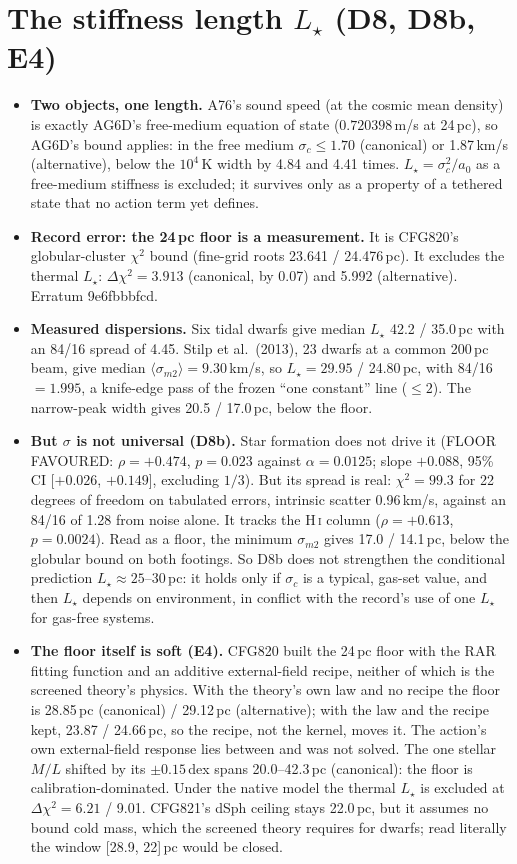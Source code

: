 \documentclass[10pt]{article}
\begin{document}
\section{The stiffness length $L_\star$ (D8, D8b, E4)}
\begin{itemize}
\item \textbf{Two objects, one length.} A76's sound speed (at the cosmic mean density) is exactly AG6D's free-medium equation of state ($0.720398$\,m/s at 24\,pc), so AG6D's bound applies: in the free medium $\sigma_c\le1.70$ (canonical) or 1.87\,km/s (alternative), below the $10^4$\,K width by 4.84 and 4.41 times. $L_\star=\sigma_c^2/a_0$ as a free-medium stiffness is excluded; it survives only as a property of a tethered state that no action term yet defines.
\item \textbf{Record error: the 24\,pc floor is a measurement.} It is CFG820's globular-cluster $\chi^2$ bound (fine-grid roots 23.641 / 24.476\,pc). It excludes the thermal $L_\star$: $\Delta\chi^2=3.913$ (canonical, by 0.07) and 5.992 (alternative). Erratum 9e6fbbbfcd.
\item \textbf{Measured dispersions.} Six tidal dwarfs give median $L_\star$ 42.2 / 35.0\,pc with an 84/16 spread of 4.45. Stilp et al.\ (2013), 23 dwarfs at a common 200\,pc beam, give median $\langle\sigma_{m2}\rangle=9.30$\,km/s, so $L_\star=29.95$ / 24.80\,pc, with 84/16 $=1.995$, a knife-edge pass of the frozen ``one constant'' line ($\le2$). The narrow-peak width gives 20.5 / 17.0\,pc, below the floor.
\item \textbf{But $\sigma$ is not universal (D8b).} Star formation does not drive it (FLOOR FAVOURED: $\rho=+0.474$, $p=0.023$ against $\alpha=0.0125$; slope $+0.088$, 95\% CI [$+0.026$, $+0.149$], excluding $1/3$). But its spread is real: $\chi^2=99.3$ for 22 degrees of freedom on tabulated errors, intrinsic scatter 0.96\,km/s, against an 84/16 of 1.28 from noise alone. It tracks the H\,\textsc{i} column ($\rho=+0.613$, $p=0.0024$). Read as a floor, the minimum $\sigma_{m2}$ gives 17.0 / 14.1\,pc, below the globular bound on both footings. So D8b does not strengthen the conditional prediction $L_\star\approx25$--30\,pc: it holds only if $\sigma_c$ is a typical, gas-set value, and then $L_\star$ depends on environment, in conflict with the record's use of one $L_\star$ for gas-free systems.
\item \textbf{The floor itself is soft (E4).} CFG820 built the 24\,pc floor with the RAR fitting function and an additive external-field recipe, neither of which is the screened theory's physics. With the theory's own law and no recipe the floor is 28.85\,pc (canonical) / 29.12\,pc (alternative); with the law and the recipe kept, 23.87 / 24.66\,pc, so the recipe, not the kernel, moves it. The action's own external-field response lies between and was not solved. The one stellar $M/L$ shifted by its $\pm0.15$\,dex spans 20.0--42.3\,pc (canonical): the floor is calibration-dominated. Under the native model the thermal $L_\star$ is excluded at $\Delta\chi^2=6.21$ / 9.01. CFG821's dSph ceiling stays 22.0\,pc, but it assumes no bound cold mass, which the screened theory requires for dwarfs; read literally the window [28.9, 22]\,pc would be closed.

\end{itemize}
\end{document}
